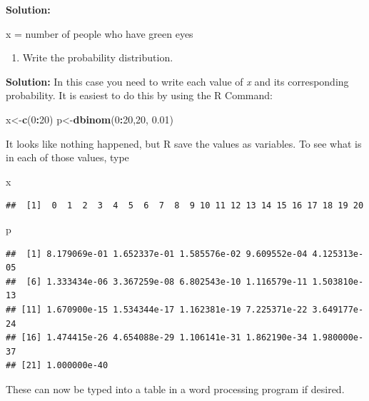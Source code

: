 \documentclass[
]{book}
\newenvironment{Shaded}{\begin{snugshade}}{\end{snugshade}}
\newcommand{\DecValTok}[1]{\textcolor[rgb]{0.00,0.00,0.81}{#1}}
\newcommand{\FloatTok}[1]{\textcolor[rgb]{0.00,0.00,0.81}{#1}}
\newcommand{\KeywordTok}[1]{\textcolor[rgb]{0.13,0.29,0.53}{\textbf{#1}}}
\newcommand{\NormalTok}[1]{#1}
\newcommand{\OperatorTok}[1]{\textcolor[rgb]{0.81,0.36,0.00}{\textbf{#1}}}
\providecommand{\tightlist}{%
  \setlength{\itemsep}{0pt}\setlength{\parskip}{0pt}}
\begin{document}
\textbf{Solution:}

x = number of people who have green eyes

\begin{enumerate}
\def\labelenumi{\alph{enumi}.}
\setcounter{enumi}{1}
\tightlist
\item
  Write the probability distribution.
\end{enumerate}

\textbf{Solution:}
In this case you need to write each value of \emph{x} and its corresponding probability. It is easiest to do this by using the R Command:

\begin{Shaded}
\begin{Highlighting}[]
\NormalTok{x<-}\KeywordTok{c}\NormalTok{(}\DecValTok{0}\OperatorTok{:}\DecValTok{20}\NormalTok{)}
\NormalTok{p<-}\KeywordTok{dbinom}\NormalTok{(}\DecValTok{0}\OperatorTok{:}\DecValTok{20}\NormalTok{,}\DecValTok{20}\NormalTok{, }\FloatTok{0.01}\NormalTok{)}
\end{Highlighting}
\end{Shaded}

It looks like nothing happened, but R save the values as variables. To see what is in each of those values, type

\begin{Shaded}
\begin{Highlighting}[]
\NormalTok{x}
\end{Highlighting}
\end{Shaded}

\begin{verbatim}
##  [1]  0  1  2  3  4  5  6  7  8  9 10 11 12 13 14 15 16 17 18 19 20
\end{verbatim}

\begin{Shaded}
\begin{Highlighting}[]
\NormalTok{p}
\end{Highlighting}
\end{Shaded}

\begin{verbatim}
##  [1] 8.179069e-01 1.652337e-01 1.585576e-02 9.609552e-04 4.125313e-05
##  [6] 1.333434e-06 3.367259e-08 6.802543e-10 1.116579e-11 1.503810e-13
## [11] 1.670900e-15 1.534344e-17 1.162381e-19 7.225371e-22 3.649177e-24
## [16] 1.474415e-26 4.654088e-29 1.106141e-31 1.862190e-34 1.980000e-37
## [21] 1.000000e-40
\end{verbatim}

These can now be typed into a table in a word processing program if desired.
\end{document}

